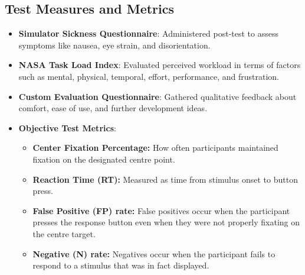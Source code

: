 \documentclass{l4proj}
\begin{document}
\subsection{Test Measures and Metrics}
\begin{itemize}
    \item \textbf{Simulator Sickness Questionnaire}: Administered post-test to assess symptoms like nausea, eye strain, and disorientation.
    \item \textbf{NASA Task Load Index}: Evaluated perceived workload in terms of factors such as mental, physical, temporal, effort, performance, and frustration.
    \item \textbf{Custom Evaluation Questionnaire}: Gathered qualitative feedback about comfort, ease of use, and further development ideas. 
    \item \textbf{Objective Test Metrics}:
        \begin{itemize}
            \item \textbf{Center Fixation Percentage:} How often participants maintained fixation on the designated centre point.
            
            \item \textbf{Reaction Time (RT):} Measured as time from stimulus onset to button press.

            \item \textbf{False Positive (FP) rate:} False positives occur when the participant presses the response button even when they were not properly fixating on the centre target.
            
            \item \textbf{Negative (N) rate:} Negatives occur when the participant fails to respond to a stimulus that was in fact displayed.
            
        \end{itemize}
\end{itemize}
\end{document}

